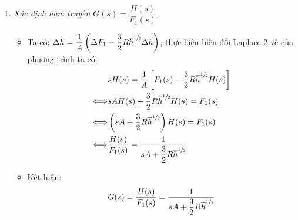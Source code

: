 \begin{enumerate}[\it a.]
        \item \textit{Xác định hàm truyền $G(s) = \dfrac{H(s)}{F_1(s)}$}
            \begin{itemize}
                \item Ta có: $\Delta \dot{h} = \dfrac{1}{A} \left({\Delta F_1 - \dfrac{3}{2} R \overline{h}^{\sfrac{1}{2}} \Delta h}\right)$, thực hiện biến đổi Laplace 2 vế của phương trình ta có:
                    \begin{align}
                        & s H(s) = \dfrac{1}{A} \left[{F_1(s) - \dfrac{3}{2} R \overline{h}^{\sfrac{1}{2}} H(s)}\right]\\
                        \Longleftrightarrow & s A H(s) + \dfrac{3}{2} R \overline{h}^{\sfrac{1}{2}} H(s) = F_1(s)\\
                        \Longleftrightarrow & \left({s A + \dfrac{3}{2} R \overline{h}^{\sfrac{1}{2}}}\right) H(s) = F_1(s) \\
                        \Longleftrightarrow & \dfrac{H(s)}{F_1(s)} = \frac{1}{s A + \dfrac{3}{2} R \overline{h}^{\sfrac{1}{2}}}
                    \end{align}

                \item Kết luận:
                    \begin{align}
                        G(s) = \dfrac{H(s)}{F_1(s)} = \frac{1}{s A + \dfrac{3}{2} R \overline{h}^{\sfrac{1}{2}}}
                    \end{align}
            \end{itemize}
    \end{enumerate}
